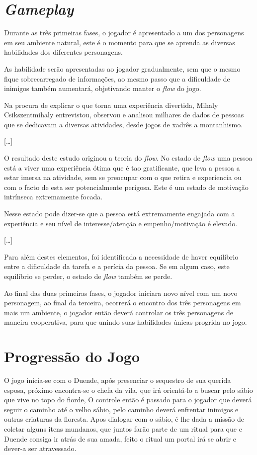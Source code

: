 \section{\textit{Gameplay}}

Durante as três primeiras fases, o jogador é apresentado a um dos personagens em seu ambiente natural, este é o momento para que se aprenda as diversas habilidades dos diferentes personagens.

As habilidade serão apresentadas ao jogador gradualmente, sem que o mesmo fique sobrecarregado de informações, ao mesmo passo que a dificuldade de inimigos também aumentará, objetivando manter o \textit{flow} do jogo.
\begin{citacao}
Na procura de explicar o que torna uma experiência divertida, Mihaly Csikszentmihaly entrevistou, observou e analisou milhares de dados de pessoas que se dedicavam a diversas atividades, desde jogos de xadrês a montanhismo.

[\ldots]

O resultado deste estudo originou a teoria do \textit{flow}. No estado de \textit{flow} uma pessoa está a viver uma experiência ótima que é tao gratificante, que leva a pessoa a estar imersa na atividade, sem se preocupar com o que retira e experiencia ou com o facto de esta ser potencialmente perigosa. Este é um estado de motivação intrínseca extremamente focada. 

Nesse estado pode dizer-se que a pessoa está extremamente engajada com a experiência e seu nível de interesse/atenção e empenho/motivação é elevado. 

[\ldots]

Para além destes elementos, foi identificada a necessidade de haver equilíbrio entre a dificuldade da tarefa e a perícia da pessoa. Se em algum caso, este equilíbrio se perder, o estado de \textit{flow} também se perde. \cite{pradadesign}
\end{citacao}

Ao final das duas primeiras fases, o jogador iniciara novo nível com um novo personagem, ao final da terceira, ocorrerá o encontro dos três personagens em mais um ambiente, o jogador então deverá controlar os três personagens de maneira cooperativa, para que unindo suas habilidades únicas progrida no jogo.


\section{Progressão do Jogo}
O jogo inicia-se com o Duende, após presenciar o sequestro de sua querida esposa, próximo encontra-se o chefa da vila, que irá orientá-lo a buscar pelo sábio que vive no topo do fiorde, O controle então é passado para o jogador que deverá seguir o caminho até o velho sábio, pelo caminho deverá enfrentar inimigos e outras criaturas da floresta. Apos dialogar com o sábio, é lhe dada a missão de coletar alguns itens mundanos, que juntos farão parte de um ritual para que e Duende consiga ir atrás de sua amada, feito o ritual um portal irá se abrir e dever-a ser atravessado.


